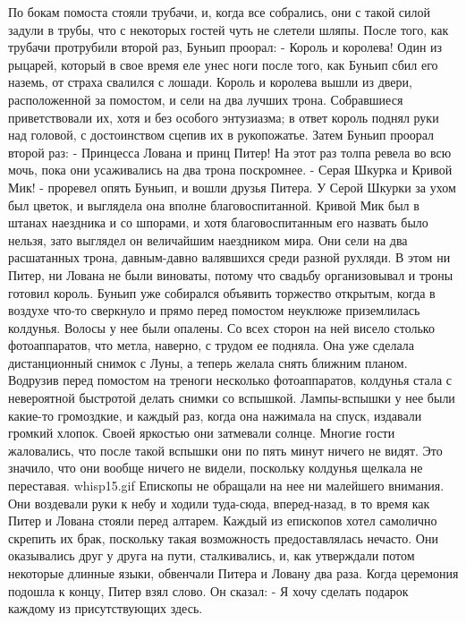     По бокам помоста стояли трубачи, и, когда все собрались, они с 
такой силой задули в трубы, что с некоторых гостей чуть не слетели 
шляпы.
    После того, как трубачи протрубили второй раз, Буньип проорал:
    - Король и королева!
    Один из рыцарей, который в свое время еле унес ноги после того, 
как Буньип сбил его наземь, от страха свалился с лошади.
    Король и королева вышли из двери, расположенной за помостом, и 
сели на два лучших трона. Собравшиеся приветствовали их, хотя и без 
особого энтузиазма; в ответ король поднял руки над головой, с 
достоинством сцепив их в рукопожатье.
    Затем Буньип проорал второй раз:
    - Принцесса Лована и принц Питер!
    На этот раз толпа ревела во всю мочь, пока они усаживались на два 
трона поскромнее.
    - Серая Шкурка и Кривой Мик! - проревел опять Буньип, и вошли 
друзья Питера. У Серой Шкурки за ухом был цветок, и выглядела она 
вполне благовоспитанной. Кривой Мик был в штанах наездника и со 
шпорами, и хотя благовоспитанным его назвать было нельзя, зато 
выглядел он величайшим наездником мира. Они сели на два расшатанных 
трона, давным-давно валявшихся среди разной рухляди. В этом ни Питер, 
ни Лована не были виноваты, потому что свадьбу организовывал и троны 
готовил король.
    Буньип уже собирался объявить торжество открытым, когда в воздухе 
что-то сверкнуло и прямо перед помостом неуклюже приземлилась 
колдунья. Волосы у нее были опалены. Со всех сторон на ней висело 
столько фотоаппаратов, что метла, наверно, с трудом ее подняла. Она 
уже сделала дистанционный снимок с Луны, а теперь желала снять ближним 
планом.
    Водрузив перед помостом на треноги несколько фотоаппаратов, 
колдунья стала с невероятной быстротой делать снимки со вспышкой. 
Лампы-вспышки у нее были какие-то громоздкие, и каждый раз, когда она 
нажимала на спуск, издавали громкий хлопок. Своей яркостью они 
затмевали солнце. Многие гости жаловались, что после такой вспышки они 
по пять минут ничего не видят. Это значило, что они вообще ничего не 
видели, поскольку колдунья щелкала не переставая.
    {whisp15.gif}
    Епископы не обращали на нее ни малейшего внимания. Они воздевали 
руки к небу и ходили туда-сюда, вперед-назад, в то время как Питер и 
Лована стояли перед алтарем. Каждый из епископов хотел самолично 
скрепить их брак, поскольку такая возможность предоставлялась нечасто. 
Они оказывались друг у друга на пути, сталкивались, и, как утверждали 
потом некоторые длинные языки, обвенчали Питера и Ловану два раза.
    Когда церемония подошла к концу, Питер взял слово. Он сказал:
    - Я хочу сделать подарок каждому из присутствующих здесь. 

